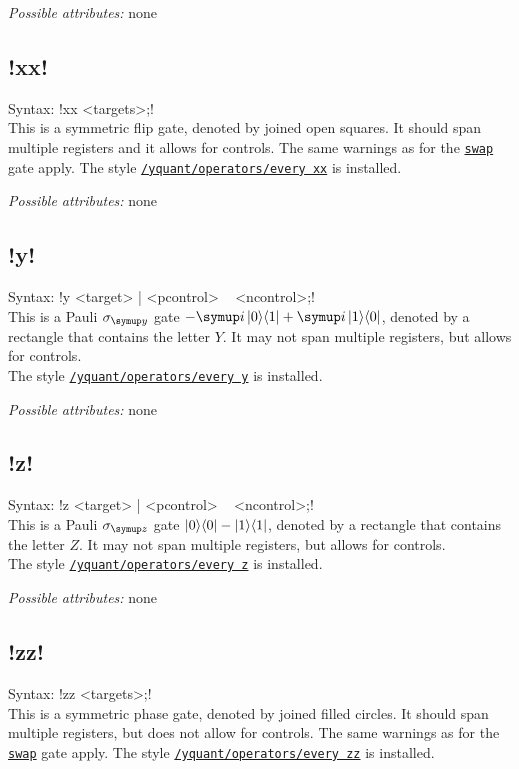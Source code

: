 \documentclass{scrartcl}
\def\gate#1{\hyperref[gate:#1]{\texttt{#1}}}
\def\style#1{\hyperref[style:#1]{\texttt{#1}}}
\def\ii{{\symup i}}
\def\ketbra#1#2{\ket{#1}\!\bra{#2}}
\begin{document}
         \emph{Possible attributes:} none

      \subsection{\texorpdfstring{\yquant!xx!}{xx}}\label{gate:xx}
         Syntax: \yquant!xx <targets>;! \\
         This is a symmetric flip gate, denoted by joined open squares.
         It should span multiple registers and it allows for controls.
         The same warnings as for the \gate{swap} gate apply.
         The style \style{/yquant/operators/every xx} is installed.

         \emph{Possible attributes:} none

      \subsection{\texorpdfstring{\yquant!y!}{y}}\label{gate:y}
         Syntax: \yquant!y <target> | <pcontrol> ~ <ncontrol>;! \\
         This is a Pauli $\sigma_{\symup y}$ gate $-\ii\ketbra01 + \ii\ketbra10$, denoted by a rectangle that contains the letter $Y$.
         It may not span multiple registers, but allows for controls. \\
         The style \style{/yquant/operators/every y} is installed.

         \emph{Possible attributes:} none

      \subsection{\texorpdfstring{\yquant!z!}{z}}\label{gate:z}
         Syntax: \yquant!z <target> | <pcontrol> ~ <ncontrol>;! \\
         This is a Pauli $\sigma_{\symup z}$ gate $\ketbra00 - \ketbra11$, denoted by a rectangle that contains the letter $Z$.
         It may not span multiple registers, but allows for controls. \\
         The style \style{/yquant/operators/every z} is installed.

         \emph{Possible attributes:} none

      \subsection{\texorpdfstring{\yquant!zz!}{zz}}\label{gate:zz}
         Syntax: \yquant!zz <targets>;! \\
         This is a symmetric phase gate, denoted by joined filled circles.
         It should span multiple registers, but does not allow for controls.
         The same warnings as for the \gate{swap} gate apply.
         The style \style{/yquant/operators/every zz} is installed.
\end{document}
